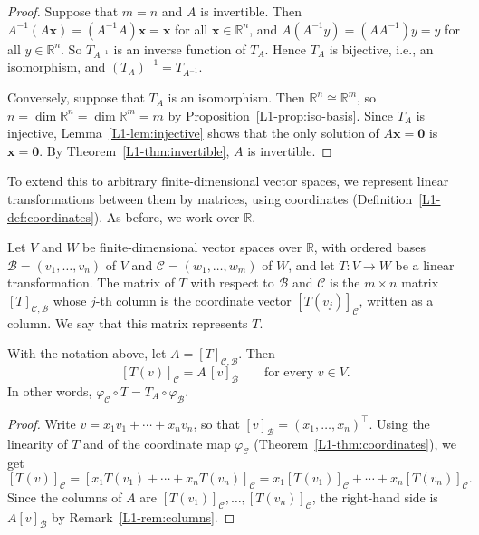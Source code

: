 \begin{proof}
    Suppose that $m = n$ and $A$ is invertible. Then $A^{-1}(A\mathbf{x}) = (A^{-1}A)\mathbf{x} = \mathbf{x}$ for all $\mathbf{x} \in \mathbb{R}^n$, and $A(A^{-1}y) = (AA^{-1})y = y$ for all $y \in \mathbb{R}^n$. So $T_{A^{-1}}$ is an inverse function of $T_A$. Hence $T_A$ is bijective, i.e., an isomorphism, and $(T_A)^{-1} = T_{A^{-1}}$.

    Conversely, suppose that $T_A$ is an isomorphism. Then $\mathbb{R}^n \cong \mathbb{R}^m$, so $n = \dim \mathbb{R}^n = \dim \mathbb{R}^m = m$ by Proposition~\ref{L1-prop:iso-basis}. Since $T_A$ is injective, Lemma~\ref{L1-lem:injective} shows that the only solution of $A\mathbf{x} = \mathbf{0}$ is $\mathbf{x} = \mathbf{0}$. By Theorem~\ref{L1-thm:invertible}, $A$ is invertible.
\end{proof}

To extend this to arbitrary finite-dimensional vector spaces, we represent linear transformations between them by matrices, using coordinates (Definition~\ref{L1-def:coordinates}). As before, we work over $\mathbb{R}$.

\begin{definition}
    Let $V$ and $W$ be finite-dimensional vector spaces over $\mathbb{R}$, with ordered bases $\mathcal{B} = (v_1, \ldots, v_n)$ of $V$ and $\mathcal{C} = (w_1, \ldots, w_m)$ of $W$, and let $T: V \to W$ be a linear transformation. The matrix of $T$ with respect to $\mathcal{B}$ and $\mathcal{C}$ is the $m \times n$ matrix $[T]_{\mathcal{C}, \mathcal{B}}$ whose $j$-th column is the coordinate vector $[T(v_j)]_{\mathcal{C}}$, written as a column. We say that this matrix represents $T$.
\end{definition}

\begin{proposition}\label{L1-prop:matrix-coords}
    With the notation above, let $A = [T]_{\mathcal{C}, \mathcal{B}}$. Then
    \[[T(v)]_{\mathcal{C}} = A \, [v]_{\mathcal{B}} \qquad \text{for every } v \in V.\]
    In other words, $\varphi_{\mathcal{C}} \circ T = T_A \circ \varphi_{\mathcal{B}}$.
\end{proposition}

\begin{proof}
    Write $v = x_1 v_1 + \cdots + x_n v_n$, so that $[v]_{\mathcal{B}} = (x_1, \ldots, x_n)^\top$. Using the linearity of $T$ and of the coordinate map $\varphi_{\mathcal{C}}$ (Theorem~\ref{L1-thm:coordinates}), we get
    \[[T(v)]_{\mathcal{C}} = [x_1 T(v_1) + \cdots + x_n T(v_n)]_{\mathcal{C}} = x_1 [T(v_1)]_{\mathcal{C}} + \cdots + x_n [T(v_n)]_{\mathcal{C}}.\]
    Since the columns of $A$ are $[T(v_1)]_{\mathcal{C}}, \ldots, [T(v_n)]_{\mathcal{C}}$, the right-hand side is $A [v]_{\mathcal{B}}$ by Remark~\ref{L1-rem:columns}.
\end{proof}

